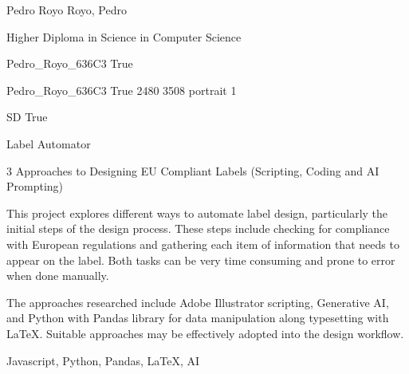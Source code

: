 
\begingroup{}\relax



\def\Key{Pedro_Royo_636C3}

{Pedro Royo}
{Royo, Pedro}

{Higher Diploma in Science in Computer Science}

{Pedro_Royo_636C3}
{True}

{Pedro_Royo_636C3}
{True}
{2480}
{3508}
{portrait}
{1}

{SD}
{True}

{Label Automator}

{3 Approaches to Designing EU Compliant Labels (Scripting, Coding and AI Prompting)}

{This project explores different ways to automate label design, particularly the initial steps of the design process. These steps include checking for compliance with European regulations and gathering each item of information that needs to appear on the label. Both tasks can be very time consuming and prone to error when done manually. 

The approaches researched include Adobe Illustrator scripting, Generative AI, and Python with Pandas library for data manipulation along typesetting with LaTeX. Suitable approaches may be effectively adopted into the design workflow.}

{Javascript, Python, Pandas, LaTeX, AI}

